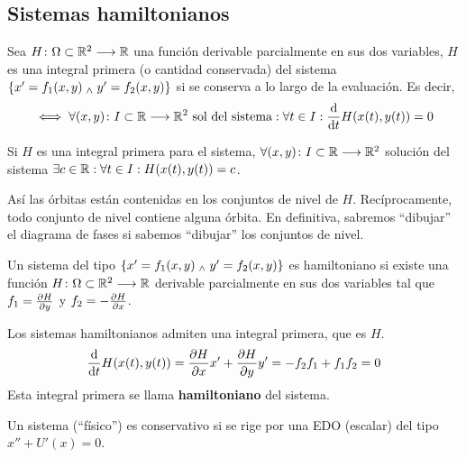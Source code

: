 
\subsection{Sistemas hamiltonianos}

\begin{defn}
	Sea $H \colon \Omega\subset \mathbb{R}^2 \longrightarrow \mathbb{R}$ una función derivable parcialmente en sus dos variables, $H$ es una integral primera (o cantidad conservada) del sistema $\{x' = f_1(x, y) \; _{\wedge} \; y'=f_2(x, y)\}$ si se conserva a lo largo de la evaluación. Es decir,
	\[\iff \forall \appl{(x, y)}{I\subset\R}{\R^2}\tex{ sol del sistema} : \forall t\in I : \odv{}{t} H(x(t), y(t)) = 0\]
\end{defn}

\begin{obs}
	Si $H$ es una integral primera para el sistema, $\forall (x, y) \colon I\subset\mathbb{R} \longrightarrow \mathbb{R}^2$ solución del sistema $\exists c\in\mathbb{R} : \forall t\in I : H(x(t), y(t)) = c$.

	Así las órbitas están contenidas en los conjuntos de nivel de $H$. Recíprocamente, todo conjunto de nivel contiene alguna órbita. En definitiva, sabremos ``dibujar'' el diagrama de fases si sabemos ``dibujar'' los conjuntos de nivel.
\end{obs}

\begin{defn}
	Un sistema del tipo $\{x' = f_1(x, y) \; _{\wedge} \; y'=f_2(x, y)\}$ es hamiltoniano si existe una función $H \colon \Omega\subset \mathbb{R}^2 \longrightarrow \mathbb{R}$ derivable parcialmente en sus dos variables tal que $f_1 = \pdv{H}{y}$ y $f_2 = -\pdv{H}{x}$.
\end{defn}

\begin{obs}
	Los sistemas hamiltonianos admiten una integral primera, que es $H$.
	\[\odv{}{t} H(x(t), y(t)) = \pdv{H}{x} x' + \pdv{H}{y} y' = -f_2 f_1 + f_1 f_2 = 0\]
	Esta integral primera se llama \textbf{hamiltoniano} del sistema.
\end{obs}

\begin{defn}
	Un sistema (``físico'') es conservativo si se rige por una EDO (escalar) del tipo $x'' + U'(x) = 0$.
\end{defn}

